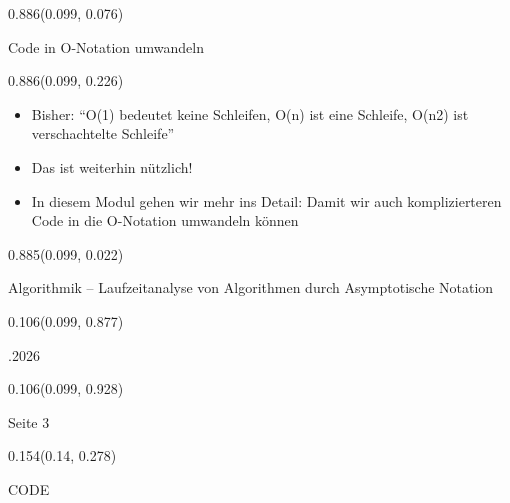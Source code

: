 \documentclass[aspectratio=169]{beamer}
\begin{document}
\begin{frame}[fragile]
\begin{textblock}{0.886}(0.099, 0.076)
  \begin{minipage}[t][0.131\paperheight]{\linewidth}
    Code in O-Notation umwandeln
  \end{minipage}
\end{textblock}

\begin{textblock}{0.886}(0.099, 0.226)
  \begin{minipage}[b][0.63\paperheight]{\linewidth}
    \small
    \begin{itemize}
      \item Bisher: “O(1) bedeutet keine Schleifen, O(n) ist eine Schleife, O(n2) ist verschachtelte Schleife”
      \item Das ist weiterhin nützlich!
      \item In diesem Modul gehen wir mehr ins Detail: Damit wir auch komplizierteren Code in die O-Notation umwandeln können
    \end{itemize}
  \end{minipage}
\end{textblock}

\begin{textblock}{0.885}(0.099, 0.022)
  \begin{minipage}[b][0.031\paperheight]{\linewidth}
    \raggedright
    \fontsize{3}{3.3}\selectfont Algorithmik – Laufzeitanalyse von Algorithmen durch Asymptotische Notation
  \end{minipage}
\end{textblock}

\begin{textblock}{0.106}(0.099, 0.877)
  \begin{minipage}[b][0.026\paperheight]{\linewidth}
    \raggedright
    \fontsize{3}{3.3}.2026
  \end{minipage}
\end{textblock}

\begin{textblock}{0.106}(0.099, 0.928)
  \begin{minipage}[b][0.031\paperheight]{\linewidth}
    \raggedright
    \fontsize{3}{3.3}\selectfont Seite 3
  \end{minipage}
\end{textblock}

\begin{textblock}{0.154}(0.14, 0.278)
  \begin{minipage}[t][0.161\paperheight]{\linewidth}
    CODE
  \end{minipage}
\end{textblock}


\end{frame}
\end{document}

